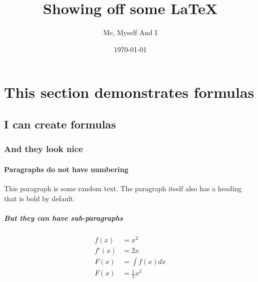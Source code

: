 \documentclass{article}
\begin{document}
\author{Me, Myself And I}
\title{Showing off some \LaTeX{}}
\date{\today{}}
\maketitle{} %
\tableofcontents{}
\newpage{} %

\section{This section demonstrates formulas}
\subsection{I can create formulas}
\subsubsection{And they look nice}
\paragraph{Paragraphs do not have numbering}
This paragraph is some random text. The paragraph itself also has a heading that is bold by default.
\subparagraph{But they can have sub-paragraphs}
\begin{align}
    f(x) &= x^2\\
    f'(x) &= 2x\\
    F(x) &= \int f(x)dx\\
    F(x) &= \frac{1}{3}x^3
\end{align}
\end{document}
